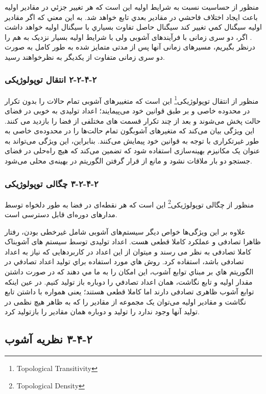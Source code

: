 منظور از حساسيت نسبت به شرايط اوليه  اين است كه هر تغیير جزئي در مقادير اوليه باعث ايجاد اختلاف فاحشي در مقادير بعدي تابع خواهد شد.  به اين معني كه اگر مقادير اوليه سيگنال كمي تغيير كند سيگنال حاصل تفاوت بسياري با سيگنال اوليه خواهد داشت . اگر، دو سری زمانی با فرآیندهای آشوبی ولی با شرایط اولیه بسیار نزدیک به هم را درنظر بگیریم، مسیرهای زمانی آنها پس از مدتی متمایز شده به طور کامل به صورت دو سری زمانی متفاوت از یکدیگر به نظرخواهند رسید.

\subsubsection{‏۲‏-‏۴‏-‏۲‏-‏۲‏ انتقال توپولوژیکی}

منظور از انتقال توپولوژیکی\footnote{Topological Transitivity} این است که متغییرهای آشوبی تمام حالات را بدون تکرار در محدوده خاصی و بر طبق قوانین خود می‌پیمایند؛ اعداد تولیدی به خوبی در فضای حالت پخش می‌شوند و بعد از چند تکرار قسمت های مختلفی از فضا را بازدید می کنند. این ویژگی بیان می‌کند که متغیرهای آشوبگون تمام حالت‌ها را در محدوده‌ی خاصی به طور غیرتکراری با توجه به قوانین خود پیمایش می‌کنند. بنابراین، این ویژگی می‌تواند به عنوان یک مکانیزم بهینه‌سازی استفاده شود که تضمین می‌کند که هیچ راه‌حلی در فضای جستجو دو بار ملاقات نشود و مانع از قرار گرفتن الگوریتم در بهینه‌ی محلی می‌شود.

\subsubsection{‏۲‏-‏۴‏-‏۲‏-‏۳‏ چگالی توپولوژیکی}

منظور از چگالی توپولوژیکی\footnote{Topological Density} این است که هر نقطه‌ای در فضا به طور دلخواه توسط مدارهای دوره‌ای قابل دسترسی است.

علاوه بر این ویژگی‌ها خواص دیگر سیستم‌های آشوبی شامل غیرخطی بودن، رفتار ظاهرا تصادفی و عملکرد کاملا قطعی هست. اعداد تولیدی توسط سیستم های آشوبناک کاملا تصادفی به نظر می رسند و میتوان از این اعداد در کاربردهایی که نیاز به اعداد تصادفی  باشد، استفاده کرد. روش هاي مورد استفاده براي توليد اعداد تصادفي در الگوريتم هاي بر مبناي توابع آشوب، اين امكان را به ما مي دهند كه در صورت داشتن مقدار اوليه و تابع نگاشت، همان اعداد تصادفي را دوباره باز توليد كنيم. در عین اینکه توابع آشوب ظاهری تصادفی دارند اما کاملا قطعی هستند؛ یعنی همواره با داشتن تابع نگاشت و مقادیر اولیه می‌توان یک مجموعه از مقادیر را که به ظاهر هیچ نظمی در تولید آنها وجود ندارد را تولید و دوباره همان مقادیر را بازتولید کرد.

\subsection{‏۲‏-‏۴‏-‏۳‏ نظریه آشوب}

